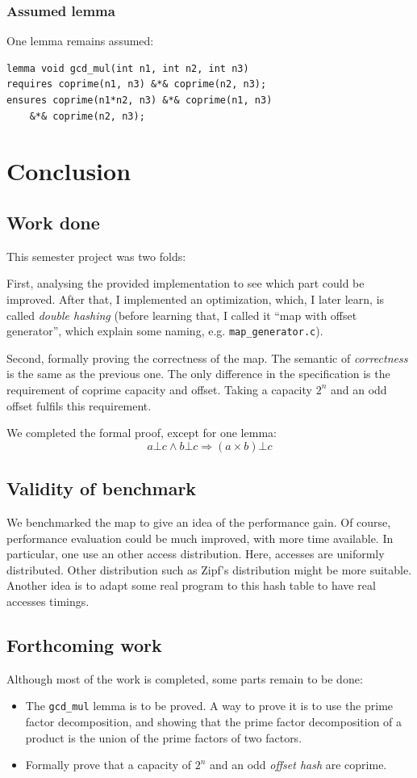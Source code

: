 \documentclass[oneside]{article}
\begin{document}
\subsubsection{Assumed lemma}
One lemma remains assumed: 
\begin{lemma}
	\begin{lstlisting}
lemma void gcd_mul(int n1, int n2, int n3)
requires coprime(n1, n3) &*& coprime(n2, n3);
ensures coprime(n1*n2, n3) &*& coprime(n1, n3) 
	&*& coprime(n2, n3);
	\end{lstlisting}
\end{lemma}


\section{Conclusion}
\subsection{Work done}
This semester project was two folds: 

First, analysing the provided implementation to see which part could be improved. After that, I implemented an optimization, which, I later learn, is called \emph{double hashing} (before learning that, I called it ``map with offset generator'', which explain some naming, e.g. \texttt{map\_generator.c}).

Second, formally proving the correctness of the map. The semantic of \emph{correctness} is the same as the previous one. The only difference in the specification is the requirement of coprime capacity and offset. Taking a capacity $2^n$ and an odd offset fulfils this requirement.

We completed the formal proof, except for one lemma: 
$$a\bot c \wedge b\bot c \Rightarrow (a\times b)\bot c$$
\subsection{Validity of benchmark}
We benchmarked the map to give an idea of the performance gain. Of course, performance evaluation could be much improved, with more time available. In particular, one use an other access distribution. Here, accesses are uniformly distributed. Other distribution such as Zipf's distribution might be more suitable. Another idea is to adapt some real program to this hash table to have real accesses timings.

\subsection{Forthcoming work}
Although most of the work is completed, some parts remain to be done: 
\begin{itemize}
	\item The \texttt{gcd\_mul} lemma is to be proved. A way to prove it is to use the prime factor decomposition, and showing that the prime factor decomposition of a product is the union of the prime factors of two factors.
	\item Formally prove that a capacity of $2^n$ and an odd \emph{offset hash} are coprime.
\end{itemize}
\end{document}

